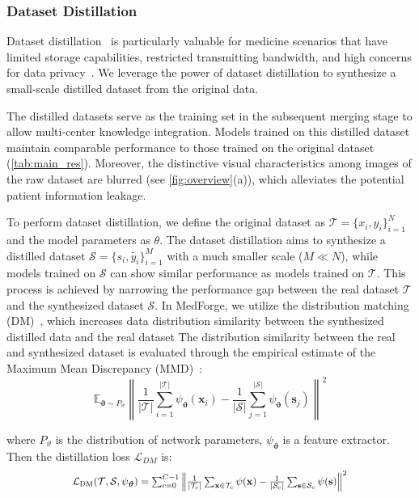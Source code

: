 \subsubsection{Dataset Distillation}
Dataset distillation~\cite{wang2018dataset, yu2023dataset, lei2023comprehensive} is particularly valuable for medicine scenarios that have limited storage capabilities, restricted transmitting bandwidth, and high concerns for data privacy~\cite{li2024dataset}. 
We leverage the power of dataset distillation to synthesize a small-scale distilled dataset from the original data.

The distilled datasets serve as the training set in the subsequent merging stage to allow multi-center knowledge integration. Models trained on this distilled dataset maintain comparable performance to those trained on the original dataset (\ref{tab:main_res}). Moreover, the distinctive visual characteristics among images of the raw dataset are blurred (see \ref{fig:overview}(a)), which alleviates the potential patient information leakage. 

To perform dataset distillation, we define the original dataset as $\mathcal{T}=\{x_i,y_i\}^N_{i=1}$ and the model parameters as $\theta$. The dataset distillation aims to synthesize a distilled dataset ${\mathcal{S}=\{{s_i},\tilde{y_i}\}^M_{i=1}}$ with a much smaller scale (${M \ll N}$), while models trained on $\mathcal{S}$ can show similar performance as models trained on $\mathcal{T}$. 
This process is achieved by narrowing the performance gap between the real dataset $\mathcal{T}$ and the synthesized dataset $\mathcal{S}$. In MedForge, we utilize the distribution matching (DM)~\cite{zhao2023dataset}, which increases data distribution similarity between the synthesized distilled data and the real dataset
The distribution similarity between the real and synthesized dataset is evaluated through the empirical estimate of the Maximum Mean Discrepancy (MMD)~\cite{gretton2012kernel}:
\begin{equation}
\mathbb{E}_{\boldsymbol{\vartheta} \sim P_{\vartheta}}\left\|\frac{1}{|\mathcal{T}|} \sum_{i=1}^{|\mathcal{T}|} \psi_{\boldsymbol{\vartheta}}\left(\boldsymbol{x}_i\right)-\frac{1}{|\mathcal{S}|} \sum_{j=1}^{|\mathcal{S}|} \psi_{\boldsymbol{\vartheta}}\left(\boldsymbol{s}_j\right)\right\|^2
\end{equation}

where $P_\vartheta$ is the distribution of network parameters, $\psi_{\boldsymbol{\vartheta}}$ is a feature extractor. Then the distillation loss $\mathcal{L}_{DM}$ is:
\begin{equation}\scalebox{0.9}{$
\mathcal{L}_{\mathrm{DM}}(\mathcal{T},\mathcal{S},\psi_{\boldsymbol{\vartheta}})=\sum_{c=0}^{C-1}\left\|\frac{1}{\left|\mathcal{T}_c\right|} \sum_{\mathbf{x} \in \mathcal{T}_c} \psi(\mathbf{x})-\frac{1}{\left|\mathcal{S}_c\right|} \sum_{\mathbf{s} \in \mathcal{S}_c} \psi(\mathbf{s})\right\|^2$}
\end{equation}

